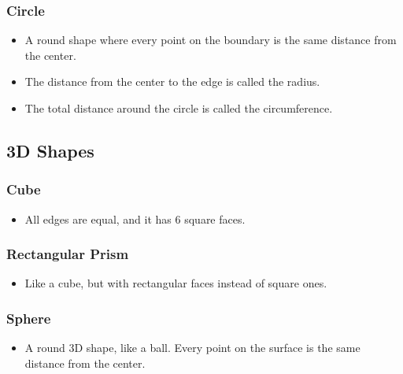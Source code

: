 
\subsubsection{Circle}
\begin{itemize}
    \item A round shape where every point on the boundary is the same distance from the center.
    \item The distance from the center to the edge is called the radius.
    \item The total distance around the circle is called the circumference.
\end{itemize}

\subsection{3D Shapes}
\subsubsection{Cube}
\begin{itemize}
    \item All edges are equal, and it has 6 square faces.
\end{itemize}

\subsubsection{Rectangular Prism}
\begin{itemize}
    \item Like a cube, but with rectangular faces instead of square ones.
\end{itemize}

\subsubsection{Sphere}
\begin{itemize}
    \item A round 3D shape, like a ball. Every point on the surface is the same distance from the center.
\end{itemize}

